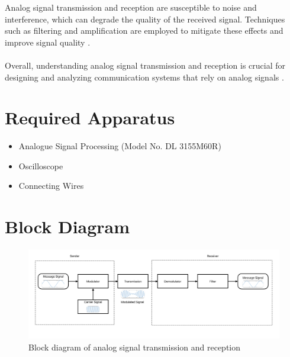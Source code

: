 \documentclass[12pt]{article}
\begin{document}
Analog signal transmission and reception are susceptible to noise and interference, which can degrade the quality of the received signal. Techniques such as filtering and amplification are employed to mitigate these effects and improve signal quality \cite{haykin2001communication}.
\\\\
Overall, understanding analog signal transmission and reception is crucial for designing and analyzing communication systems that rely on analog signals \cite{proakis2007digital}.

\section*{Required Apparatus}
\begin{itemize}
    \item  Analogue Signal Processing (Model No. DL 3155M60R)
    \item Oscilloscope
    \item Connecting Wires
\end{itemize}

\section*{Block Diagram}
\begin{figure}[H]
    \centering
    \includegraphics[width=\textwidth]{block.png}
    \caption{Block diagram of analog signal transmission and reception}
    \label{fig:block_diagram}
\end{figure}
\end{document}
